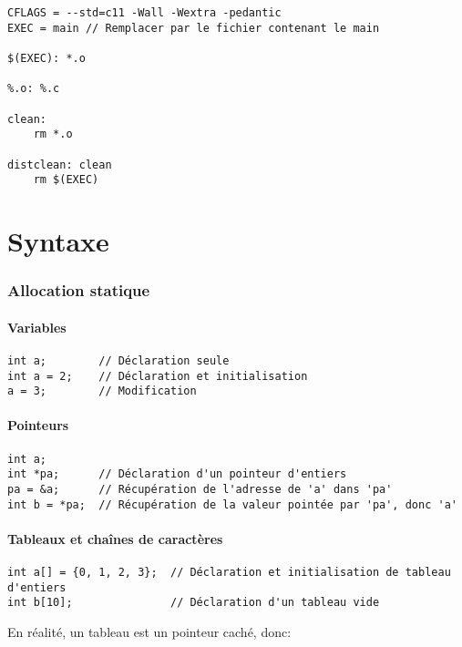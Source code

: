 \documentclass[10pt,a4paper,french]{article}
\let\oldpart\part
\renewcommand\part{\newpage\oldpart}
\begin{document}
\begin{verbatim}
CFLAGS = --std=c11 -Wall -Wextra -pedantic
EXEC = main // Remplacer par le fichier contenant le main

$(EXEC): *.o

%.o: %.c

clean:
	rm *.o

distclean: clean
	rm $(EXEC)
\end{verbatim}

\part{Syntaxe}

\section{Allocation statique}

\subsection{Variables}

\begin{verbatim}
int a;        // Déclaration seule
int a = 2;    // Déclaration et initialisation
a = 3;        // Modification
\end{verbatim}

\subsection{Pointeurs}

\begin{verbatim}
int a;
int *pa;      // Déclaration d'un pointeur d'entiers
pa = &a;      // Récupération de l'adresse de 'a' dans 'pa'
int b = *pa;  // Récupération de la valeur pointée par 'pa', donc 'a'
\end{verbatim}

\subsection{Tableaux et chaînes de caractères}

\begin{verbatim}
int a[] = {0, 1, 2, 3};  // Déclaration et initialisation de tableau d'entiers
int b[10];               // Déclaration d'un tableau vide
\end{verbatim}

En réalité, un tableau est un pointeur caché, donc:
\end{document}
